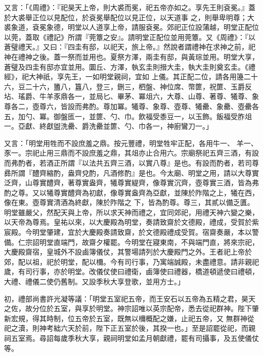 \begin{pinyinscope}
 又言：「《周禮》：『祀昊天上帝，則大裘而冕，祀五帝亦如之。享先王則袞冕。』蓋於大裘舉正位以見配位，於袞冕舉配位以見正位，以天道事
 之，則舉卑明尊；大裘象道，袞冕象德，明堂以人道享上帝，請服袞冕。郊祀正位設蒲越，明堂正配位以莞，蓋取《禮記》所謂『莞簟之安』。請明堂正配位並用莞簟。又《周禮》：『以蒼璧禮天。』又曰：『四圭有邸，以祀天，旅上帝。』然說者謂禮神在求神之前，祀神在禮神之後。蓋一祭而並用也。夏祭方澤，兩圭有邸，與黃琮並用。明堂大享，蒼璧及四圭有邸亦宜並用。圜丘、方澤，執玄圭則搢大圭，執大圭則奠玄圭。《禮經》，祀大神祇，享先王，一如明堂親祠，宜如
 上儀。其正配二位，請各用籩二十六，豆二十六，簠八，簋八，登三，鉶三，柶盤、神位席、幣篚，祝篚、玉爵反坫、瑤爵、牛羊豕鼎各一，並局匕、畢茅、冪俎六，大尊、山尊、著尊、犧尊、象尊各二，壺尊六，皆設而弗酌。尊加冪。犧尊、象尊、壺尊、犧罍、象罍、壺罍各五，加勺、冪。御盤匜一，並篚、勺、巾。飲福受黍豆一，以玉飾。飯福受胙俎一。亞獻、終獻盥洗罍、爵洗罍並篚、勺、巾各一，神廚鸞刀一。」



 又言：「明堂用牲而不設庶羞之鼎。按元豐禮，明堂牲牢正配，各用牛一、
 羊一、豕一。宗祀止用三鼎而不設庶羞之鼎，其俎亦止合用六。宗廟祭祀五齊三酒，有設而弗酌者，若酒正所謂『以法共五齊三酒，以實八尊』是也。有設而酌者，若司尊彞所謂『醴齊縮酌，盎齊兌酌，凡酒修酌』是也。今太廟、明堂之用，請以大尊實泛齊，山尊實醴齊，著尊實盎齊，犧尊實緹齊，像尊實沉齊，壺尊實三酒，皆為弗酌之尊。又以犧尊實醴齊為初獻，像尊實盎齊為亞獻，並陳於阼階之上，犧在西，像在東。壺尊實清酒為終獻，陳於阼階之
 下，皆為酌尊。尊三，其貳以備乏匱。明堂雖嚴父，然配天與上帝，所以求天神而禮之，宜同郊祀，用禮天神六變之樂，以天帝為尊焉。皇祐以來，以大慶殿為明堂，奏請致齋於文德殿，禮成，受賀於紫宸殿。今明堂肇建，宜於大慶殿奏請致齋，於文德殿禮成受賀。宿齋奏嚴，本以警備。仁宗詔明堂直端門，故齋夕權罷。今明堂在寢東南，不與端門直，將來宗祀，大慶殿齋宿，皇城外不設鹵簿儀仗，其警場請列於大慶殿門之外。王者祀上帝於
 郊，配以祖，祀於明堂，配以檷。今有司行事，乃寓端誠殿，未盡禮意。請非親祀歲，有司行事，亦於明堂。改儀仗使曰禮衛，鹵簿使曰禮器，橋道頓遞使曰禮頓，大禮、禮儀二使仍舊制。又設季秋大享登歌，並用方士。」



 初，禮部尚書許光凝等議：「明堂五室祀五帝，而王安石以五帝為五精之君，昊天之佐，故分位於五室，與享於明堂。神宗詔唯以英宗配帝，悉去從祀群神。陛下肇新宏規，得其時制，位五帝於五室，既無以檷概配之嫌，止祀五帝，又
 無群神從祀之瀆，則神考絀六天於前，陛下正五室於後，其揆一也。」至是詔罷從祀，而親祠五室焉。尋詔每歲季秋大享，親祠明堂如孟月朝獻禮，罷有司攝事，及五使儀仗等。




\end{pinyinscope}
